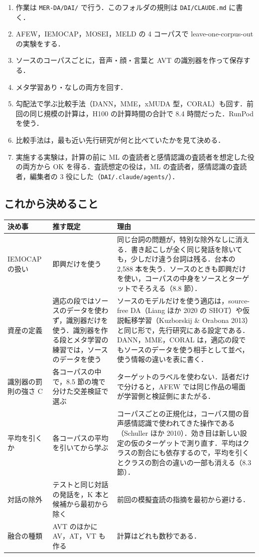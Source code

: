 \documentclass[11pt,a4paper]{ltjsarticle}
\begin{document}
\begin{enumerate}
  \item 作業は \texttt{MER-DA/DAI/} で行う．このフォルダの規則は \texttt{DAI/CLAUDE.md} に書く．
  \item AFEW，IEMOCAP，MOSEI，MELD の 4 コーパスで leave-one-corpus-out の実験をする．
  \item ソースのコーパスごとに，音声・顔・言葉と AVT の識別器を作って保存する．
  \item メタ学習あり・なしの両方を回す．
  \item 勾配法で学ぶ比較手法（DANN，MME，xMUDA 型，CORAL）も回す．前回の同じ規模の計算は，H100 の計算時間の合計で 8.4 時間だった．RunPod を使う．
  \item 比較手法は，最も近い先行研究が何と比べていたかを見て決める．
  \item 実施する実験は，計算の前に ML の査読者と感情認識の査読者を想定した役の両方から OK を得る．査読想定の役は，ML の査読者，感情認識の査読者，編集者の 3 役にした（\texttt{DAI/.claude/agents/}）．
\end{enumerate}

\subsection{これから決めること}

\begin{center}\small
\begin{tabularx}{\linewidth}{@{}P{28mm}P{42mm}L@{}}
\toprule
決め事 & 推す既定 & 理由 \\
\midrule
IEMOCAP の扱い & 即興だけを使う & 同じ台詞の問題が，特別な除外なしに消える．書き起こしが全く同じ発話を除いても，少しだけ違う台詞は残る．台本の 2,588 本を失う．ソースのときも即興だけを使い，コーパスの中身をソースとターゲットでそろえる（8.8 節）． \\
資産の定義 & 適応の段ではソースのデータを使わず，識別器だけを使う．識別器を作る段とメタ学習の練習では，ソースのデータを使う & ソースのモデルだけを使う適応は，source-free DA（Liang ほか 2020 の SHOT）や仮説転移学習（Kuzborskij \& Orabona 2013）と同じ形で，先行研究にある設定である．DANN，MME，CORAL は，適応の段でもソースのデータを使う相手として並べ，使う情報の違いを表に書く． \\
識別器の罰則の強さ C & 各コーパスの中で，8.5 節の塊で分けた交差検証で選ぶ & ターゲットのラベルを使わない．話者だけで分けると，AFEW では同じ作品の場面が学習側と検証側にまたがる． \\
平均を引くか & 各コーパスの平均を引いてから学ぶ & コーパスごとの正規化は，コーパス間の音声感情認識で使われてきた操作である（Schuller ほか 2010）．効き目は新しい設定の仮のターゲットで測り直す．平均はクラスの割合にも依存するので，平均を引くとクラスの割合の違いの一部も消える（8.3 節）． \\
対話の除外 & テストと同じ対話の発話を，K 本と候補から最初から除く & 前回の模擬査読の指摘を最初から避ける． \\
融合の種類 & AVT のほかに AV，AT，VT も作る & 計算はどれも数秒である． \\
\bottomrule
\end{tabularx}
\end{center}
\end{document}

